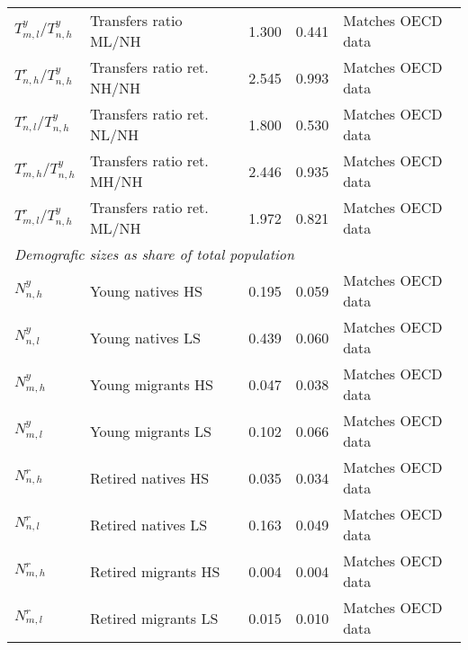 \begin{tabular}{llrrl}
$T_{m,l}^y / T_{n,h}^y$ &    Transfers ratio ML/NH &  1.300 &  0.441 &         Matches OECD data \\
$T_{n,h}^r / T_{n,h}^y$ &   Transfers ratio ret. NH/NH &  2.545 &  0.993 &         Matches OECD data \\
$T_{n,l}^r / T_{n,h}^y$ &   Transfers ratio ret. NL/NH &  1.800 &  0.530 &         Matches OECD data \\
$T_{m,h}^r / T_{n,h}^y$ &   Transfers ratio ret. MH/NH &  2.446 &  0.935 &         Matches OECD data \\
$T_{m,l}^r / T_{n,h}^y$ &   Transfers ratio ret. ML/NH &  1.972 &  0.821 &         Matches OECD data \\
\hline
\multicolumn{5}{l}{\textit{Demografic sizes as share of total population}} \\ \hline
$N_{n,h}^y$     &       Young natives HS &  0.195 &  0.059 &         Matches OECD data \\
$N_{n,l}^y$     &       Young natives LS &  0.439 &  0.060 &         Matches OECD data \\
$N_{m,h}^y$     &      Young migrants HS &  0.047 &  0.038 &         Matches OECD data \\
$N_{m,l}^y$     &      Young migrants LS &  0.102 &  0.066 &         Matches OECD data \\
$N_{n,h}^r$     &     Retired natives HS &  0.035 &  0.034 &         Matches OECD data \\
$N_{n,l}^r$     &     Retired natives LS &  0.163 &  0.049 &         Matches OECD data \\
$N_{m,h}^r$     &      Retired migrants HS &  0.004 &  0.004 &         Matches OECD data \\
$N_{m,l}^r$     &      Retired migrants LS &  0.015 &  0.010 &         Matches OECD data \\
\hline\hline
\end{tabular}